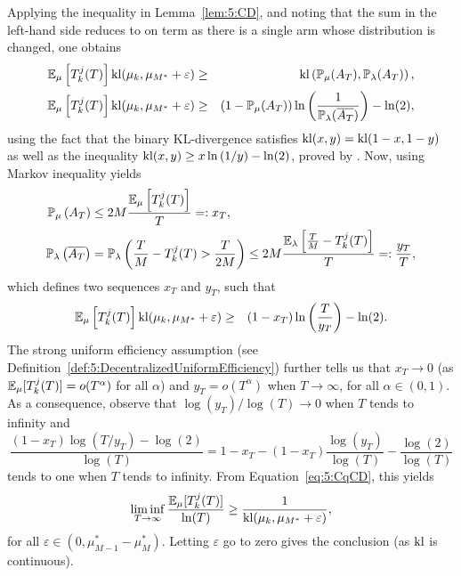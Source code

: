 Applying the inequality in Lemma~\ref{lem:5:CD}, and noting that the sum in the left-hand side reduces to on term as there is a single arm whose distribution is changed, one obtains
\begin{eqnarray*}
  \mathbb{E}_{\mu}\left[T_k^j(T)\right] \mathrm{kl} (\mu_k, \mu_{M^*}+\varepsilon) &\geq & \mathrm{kl} \left(\mathbb{P}_{\mu}(A_T),\mathbb{P}_{\lambda}(A_T)\right),\nonumber \\
  \mathbb{E}_{\mu}\left[T_k^j(T)\right] \mathrm{kl} (\mu_k, \mu_{M^*}+\varepsilon) &\geq & \left(1 - \mathbb{P}_{\mu}(A_T)\right) \ln \left(\frac{1}{\mathbb{P}_{\lambda}(\overline{A_T})}\right) - \ln(2),
\end{eqnarray*}
using the fact that the binary KL-divergence satisfies $\mathrm{kl}(x,y) = \mathrm{kl}(1-x,1-y)$ as well as the inequality  $\mathrm{kl}(x, y) \geq x \ln\left(1/y\right) - \ln(2)$, proved by \cite{Garivier16TrueShape}.
Now, using Markov inequality yields
\begin{align*}
  \mathbb{P}_{\mu}\left(A_T\right)
    & \leq 2M\frac{\mathbb{E}_\mu\left[T^j_k(T)\right]}{T} =: x_T, \\
  \mathbb{P}_{\lambda}\left(\overline{A_T}\right)
    & = \mathbb{P}_{\lambda}\left(\frac{T}{M} - T^j_k(T) > \frac{T}{2M}\right) \leq 2M\frac{\mathbb{E}_\lambda\left[ \frac{T}{M} - T^j_k(T)\right]}{T} =: \frac{y_T}{T},
\end{align*}
which defines two sequences $x_T$ and $y_T$, such that
\begin{eqnarray}\label{eq:5:CqCD}
  \mathbb{E}_{\mu}\left[T_k^j(T)\right] \mathrm{kl} (\mu_k, \mu_{M^*}+\varepsilon) &\geq & \left(1 - x_T\right) \ln \left(\frac{T}{y_T}\right) - \ln(2).
\end{eqnarray}
The strong uniform efficiency assumption  (see Definition~\ref{def:5:DecentralizedUniformEfficiency}) further tells us that $x_T \rightarrow 0$ (as $\mathbb{E}_\mu[T_k^j(T)] = o(T^\alpha)$ for all $\alpha$) and $y_T = o(T^\alpha)$ when $T \to \infty$, for all $\alpha \in (0,1)$.
As a consequence, observe that $\log(y_T)/\log(T) \rightarrow 0$ when $T$ tends to infinity and
\[
  \frac{\left(1 - x_T\right) \log \left({T}/{y_T}\right) - \log(2)}{\log(T)} = 1-x_T - (1-x_T) \frac{\log(y_T)}{\log(T)} - \frac{\log(2)}{\log(T)}
\]
tends to one when $T$ tends to infinity.
From Equation~\eqref{eq:5:CqCD}, this yields
\begin{equation}\label{eq:5:CqCD2}
  \liminf_{T\to\infty} \frac{\mathbb{E}_{\mu}[T_k^j(T)]}{\ln(T)} \geq \frac{1}{\mathrm{kl}(\mu_k,\mu_{M^*}+\varepsilon)},
\end{equation}
for all $\varepsilon \in \left(0, \mu_{M-1}^* - \mu_M^*\right)$.
Letting $\varepsilon$ go to zero gives the conclusion (as $\mathrm{kl}$ is continuous).

